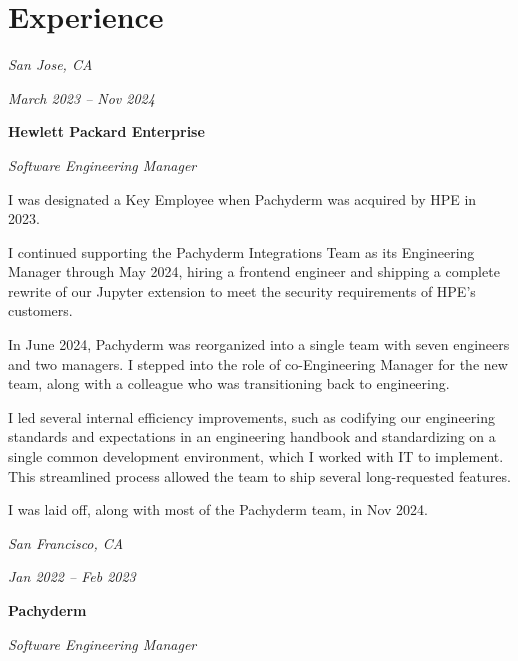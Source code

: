 \documentclass[10pt, letterpaper]{article}
\begin{document}
\section{Experience}

\begin{twocolentry}{
    \textit{San Jose, CA}

    \textit{March 2023 – Nov 2024}
}
    \textbf{Hewlett Packard Enterprise}

    \textit{Software Engineering Manager}
\end{twocolentry}

\vspace{0.10 cm}

\begin{onecolentry}
    \begin{highlights}
        \item I was designated a Key Employee when Pachyderm was acquired by HPE in 2023.
        \item I continued supporting the Pachyderm Integrations Team as its Engineering Manager through May 2024, hiring a frontend engineer and shipping a complete rewrite of our Jupyter extension to meet the security requirements of HPE's customers.
        \item In June 2024, Pachyderm was reorganized into a single team with seven engineers and two managers. I stepped into the role of co-Engineering Manager for the new team, along with a colleague who was transitioning back to engineering.
        \item I led several internal efficiency improvements, such as codifying our engineering standards and expectations in an engineering handbook and standardizing on a single common development environment, which I worked with IT to implement. This streamlined process allowed the team to ship several long-requested features.
        \item I was laid off, along with most of the Pachyderm team, in Nov 2024.
    \end{highlights}
\end{onecolentry}

\vspace{0.2 cm}

\begin{twocolentry}{
    \textit{San Francisco, CA}

    \textit{Jan 2022 – Feb 2023}
}
    \textbf{Pachyderm}

    \textit{Software Engineering Manager}
\end{twocolentry}
\end{document}
